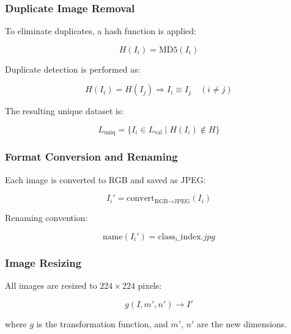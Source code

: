 \documentclass[preprint,12pt]{elsarticle}
\begin{document}
\subsubsection{Duplicate Image Removal}

To eliminate duplicates, a hash function is applied:

\begin{equation}
H(I_i) = \text{MD5}(I_i)
\label{eq:hash-function}
\end{equation}

Duplicate detection is performed as:

\begin{equation}
H(I_i) = H(I_j) \Rightarrow I_i \equiv I_j \quad (i \ne j)
\label{eq:duplicate-detection}
\end{equation}

The resulting unique dataset is:

\begin{equation}
L_{\text{uniq}} = \{ I_i \in L_{\text{val}} \mid H(I_i) \notin H \}
\label{eq:unique-dataset}
\end{equation}

\subsubsection{Format Conversion and Renaming}

Each image is converted to RGB and saved as JPEG:

\begin{equation}
I_i' = \text{convert}_{\text{RGB} \rightarrow \text{JPEG}}(I_i)
\label{eq:format-conversion}
\end{equation}

Renaming convention:

\begin{equation}
\text{name}(I_i') = \text{class}_i\_\text{index}.jpg
\label{eq:naming}
\end{equation}

\subsubsection{Image Resizing}

All images are resized to \( 224 \times 224 \) pixels:

\begin{equation}
g(I, m', n') \rightarrow I'
\label{eq:image-resize}
\end{equation}

where \( g \) is the transformation function, and \( m' \), \( n' \) are the new dimensions.
\end{document}
